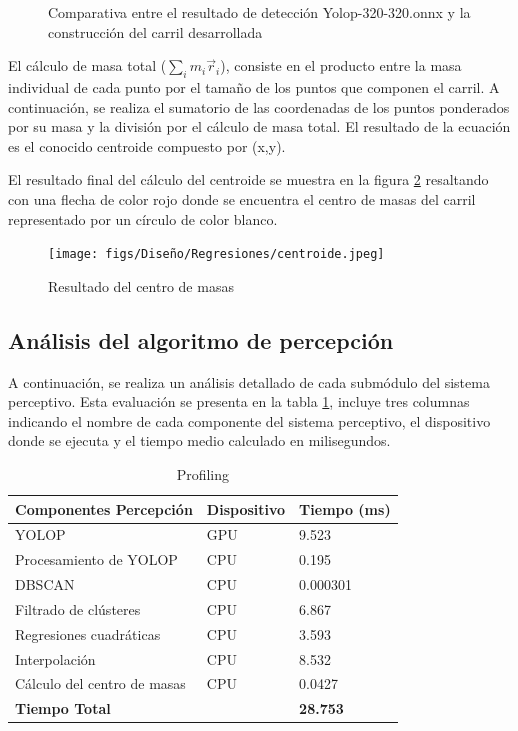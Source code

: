 \begin{figure}[H]
  \caption{Comparativa entre el resultado de detección Yolop-320-320.onnx y la construcción del carril desarrollada}
  \label{comparativa-interpolacion}
\end{figure}



  El cálculo de masa total ($\sum_{i}m_{i} \vec{r}_{i}$), consiste en el producto entre la masa individual de cada punto por el tamaño de los puntos que componen el carril. A continuación, 
  se realiza el sumatorio de las coordenadas de los puntos ponderados por su masa y la división por el cálculo de masa total. El resultado de la ecuación es el conocido centroide 
  compuesto por (x,y). \newline
  
  El resultado final del cálculo del centroide se muestra en la figura \ref{fig:centro de masas} resaltando con una flecha de color rojo donde se encuentra
  el centro de masas del carril representado por un círculo de color blanco.

  \begin{figure} [H]
    \begin{center}
      \texttt{[image: figs/Diseño/Regresiones/centroide.jpeg]}
    \end{center}
    \caption{Resultado del centro de masas}
    \label{fig:centro de masas}
  \end{figure}

  \subsection{Análisis del algoritmo de percepción}
  \label{sec:Análisis del algoritmo de percepción}
  A continuación, se realiza un análisis detallado de cada submódulo del sistema perceptivo. Esta evaluación se presenta en la tabla \ref{tab:Profiling}, incluye 
  tres columnas indicando el nombre  de cada componente del sistema perceptivo, el dispositivo donde se ejecuta y el tiempo medio calculado en milisegundos.

\begin{table}[h]
    \centering
    \begin{tabular}{| m{5cm} | m{3cm} | m{3cm} |}
        \hline
        \textbf{Componentes Percepción} & \textbf{Dispositivo} & \textbf{Tiempo (ms)} \\ \hline
        YOLOP & GPU & 9.523 \\ \hline
        Procesamiento de YOLOP & CPU & 0.195 \\ \hline
        DBSCAN & CPU & 0.000301 \\ \hline
        Filtrado de clústeres & CPU & 6.867 \\ \hline
        Regresiones cuadráticas & CPU & 3.593 \\ \hline
        Interpolación & CPU & 8.532 \\ \hline
        Cálculo del centro de masas & CPU & 0.0427 \\ \hline
        \textbf{Tiempo Total} & & \textbf{28.753} \\ \hline
    \end{tabular}
    \caption{Profiling}
    \label{tab:Profiling}
\end{table}

